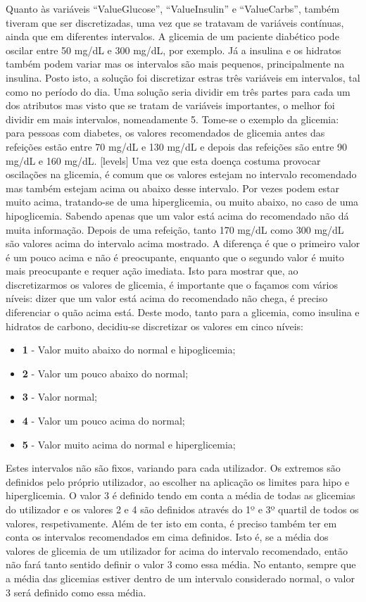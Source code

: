 Quanto às variáveis ``Value\textunderscore Glucose'', ``Value\textunderscore Insulin'' e ``Value\textunderscore Carbs'', também tiveram que ser discretizadas, uma vez que se tratavam de variáveis contínuas, ainda que em diferentes intervalos. A glicemia de um paciente diabético pode oscilar entre 50 mg/dL e 300 mg/dL, por exemplo. Já a insulina e os hidratos também podem variar mas os intervalos são mais pequenos, principalmente na insulina. 
Posto isto, a solução foi discretizar estras três variáveis em intervalos, tal como no período do dia. 
Uma solução seria dividir em três partes para cada um dos atributos mas visto que se tratam de variáveis importantes, o melhor foi dividir em mais intervalos, nomeadamente 5.
Tome-se o exemplo da glicemia: para pessoas com diabetes, os valores recomendados de glicemia antes das refeições estão entre 70 mg/dL e 130 mg/dL e depois das refeições são entre 90 mg/dL e 160 mg/dL. [levels] Uma vez que esta doença costuma provocar oscilações na glicemia, é comum que os valores estejam no intervalo recomendado mas também estejam acima ou abaixo desse intervalo. Por vezes podem estar muito acima, tratando-se de uma hiperglicemia, ou muito abaixo, no caso de uma hipoglicemia. Sabendo apenas que um valor está acima do recomendado não dá muita informação. Depois de uma refeição, tanto 170 mg/dL como 300 mg/dL são valores acima do intervalo acima mostrado. A diferença é que o primeiro valor é um pouco acima e não é preocupante, enquanto que o segundo valor é muito mais preocupante e requer ação imediata. Isto para mostrar que, ao discretizarmos os valores de glicemia, é importante que o façamos com vários níveis: dizer que um valor está acima do recomendado não chega, é preciso diferenciar o quão acima está. Deste modo, tanto para a glicemia, como insulina e hidratos de carbono, decidiu-se discretizar os valores em cinco níveis:

\begin{itemize}
\item \textbf{1} - Valor muito abaixo do normal e hipoglicemia;
\item \textbf{2} - Valor um pouco abaixo do normal;
\item \textbf{3} - Valor normal;
\item \textbf{4} - Valor um pouco acima do normal;
\item \textbf{5} - Valor muito acima do normal e hiperglicemia;
\end{itemize}
Estes intervalos não são fixos, variando para cada utilizador. Os extremos são definidos pelo próprio utilizador, ao escolher na aplicação os limites para hipo e hiperglicemia. O valor 3 é definido tendo em conta a média de todas as glicemias do utilizador e os valores 2 e 4 são definidos através do 1º e 3º quartil de todos os valores, respetivamente. Além de ter isto em conta, é preciso também ter em conta os intervalos recomendados em cima definidos. Isto é, se a média dos valores de glicemia de um utilizador for acima do intervalo recomendado, então não fará tanto sentido definir o valor 3 como essa média. No entanto, sempre que a média das glicemias estiver dentro de um intervalo considerado normal, o valor 3 será definido como essa média.

